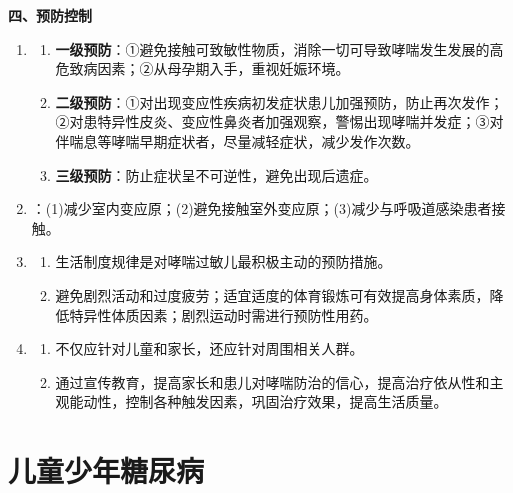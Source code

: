 \begin{keybox}
\textbf{四、预防控制}
\begin{enumerate}[leftmargin=*]
    \item {}
    \begin{enumerate}
        \item \textbf{一级预防}：①避免接触可致敏性物质，消除一切可导致哮喘发生发展的高危致病因素；②从母孕期入手，重视妊娠环境。
        \item \textbf{二级预防}：①对出现变应性疾病初发症状患儿加强预防，防止再次发作；②对患特异性皮炎、变应性鼻炎者加强观察，警惕出现哮喘并发症；③对伴喘息等哮喘早期症状者，尽量减轻症状，减少发作次数。
        \item \textbf{三级预防}：防止症状呈不可逆性，避免出现后遗症。
    \end{enumerate}
    \item {}：(1)减少室内变应原；(2)避免接触室外变应原；(3)减少与呼吸道感染患者接触。
    \item {}
    \begin{enumerate}
        \item 生活制度规律是对哮喘过敏儿最积极主动的预防措施。
        \item 避免剧烈活动和过度疲劳；适宜适度的体育锻炼可有效提高身体素质，降低特异性体质因素；剧烈运动时需进行预防性用药。
    \end{enumerate}
    \item {}
    \begin{enumerate}
        \item 不仅应针对儿童和家长，还应针对周围相关人群。
        \item 通过宣传教育，提高家长和患儿对哮喘防治的信心，提高治疗依从性和主观能动性，控制各种触发因素，巩固治疗效果，提高生活质量。
    \end{enumerate}
\end{enumerate}
\end{keybox}

\section{儿童少年糖尿病}

